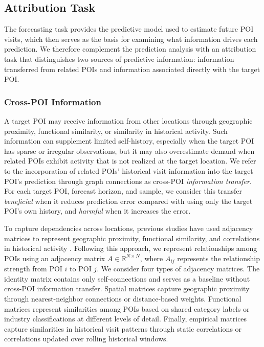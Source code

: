 \documentclass[preprint,authoryear,11pt]{elsarticle}
\def\citep#1{}%
\theoremstyle{definition}
\begin{document}
\subsection{Attribution Task}
\label{subsec:attribution_task}

The forecasting task provides the predictive model used to estimate future POI visits, which then serves as the basis for examining what information drives each prediction.
We therefore complement the prediction analysis with an attribution task that distinguishes two sources of predictive information: information transferred from related POIs and information associated directly with the target POI.

\subsubsection{Cross-POI Information}

A target POI may receive information from other locations through geographic proximity, functional similarity, or similarity in historical activity. Such information can supplement limited self-history, especially when the target POI has sparse or irregular observations, but it may also overestimate demand when related POIs exhibit activity that is not realized at the target location. 
We refer to the incorporation of related POIs' historical visit information into the target POI's prediction through graph connections as cross-POI \textit{information transfer}.
For each target POI, forecast horizon, and sample, we consider this transfer \textit{beneficial} when it reduces prediction error compared with using only the target POI's own history, and \textit{harmful} when it increases the error.

To capture dependencies across locations, previous studies have used adjacency matrices to represent geographic proximity, functional similarity, and correlations in historical activity \citep{geng2019spatiotemporal,hajisafi2023learning}. Following this approach, we represent relationships among POIs using an adjacency matrix \(A\in\mathbb{R}^{N\times N}\), where \(A_{ij}\) represents the relationship strength from POI \(i\) to POI \(j\). We consider four types of adjacency matrices. The identity matrix contains only self-connections and serves as a baseline without cross-POI information transfer. Spatial matrices capture geographic proximity through nearest-neighbor connections or distance-based weights. Functional matrices represent similarities among POIs based on shared category labels or industry classifications at different levels of detail. Finally, empirical matrices capture similarities in historical visit patterns through static correlations or correlations updated over rolling historical windows.
\end{document}
